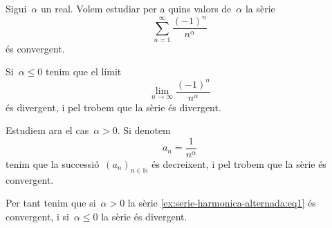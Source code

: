 \documentclass[../../main.tex]{subfiles}
\begin{document}
    \begin{example}
        \label{ex:serie-harmonica-alternada}
        Sigui~\(\alpha\) un real.
        Volem estudiar per a quins valors de~\(\alpha\) la sèrie
        \begin{equation}
            \label{ex:serie-harmonica-alternada:eq1}
            \sum_{n=1}^{\infty}\frac{(-1)^{n}}{n^{\alpha}}
        \end{equation}
        és convergent.
    \end{example}
    \begin{solution}
        Si~\(\alpha\leq0\) tenim que el límit
        \[
            \lim_{n\to\infty}\frac{(-1)^{n}}{n^{\alpha}}
        \]
        és divergent, i pel \corollari{}  trobem que la sèrie és divergent.

        Estudiem ara el cas~\(\alpha>0\).
        Si denotem
        \[
            a_{n}=\frac{1}{n^{\alpha}}
        \]
        tenim que la successió~\((a_{n})_{n\in\mathbb{N}}\) és decreixent, i pel  trobem que la sèrie és convergent.

        Per tant tenim que si~\(\alpha>0\) la sèrie \eqref{ex:serie-harmonica-alternada:eq1} és convergent, i si~\(\alpha\leq0\) la sèrie és divergent.
    \end{solution}
\end{document}
